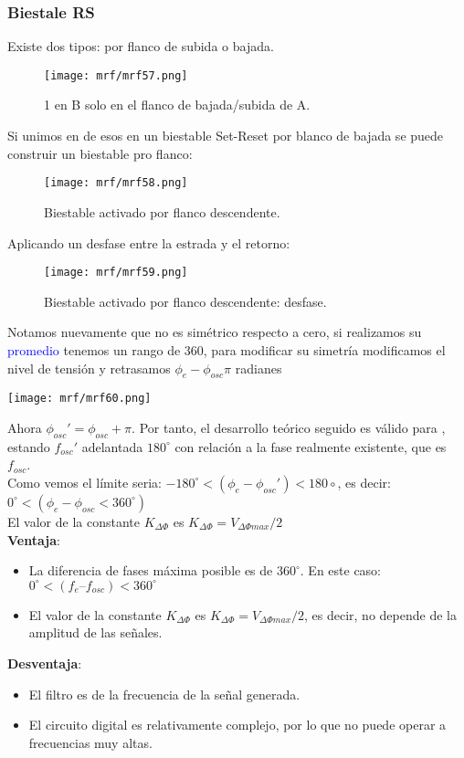 \documentclass[
	12pt, %
	fleqn, %
	a4paper, %
	oneside, %
]{LegrandOrangeBook}
\begin{document}
\subsubsection{Biestale RS}
Existe dos tipos: por flanco de subida o bajada. 
\begin{figure}[H]
\centering
\texttt{[image: mrf/mrf57.png]}
\caption{1 en B solo en el flanco de bajada/subida de A.}
\end{figure}
Si unimos en de esos en un biestable Set-Reset por blanco de bajada se puede construir un biestable pro flanco:
\begin{figure}[H]
\centering
\texttt{[image: mrf/mrf58.png]}
\caption{Biestable activado por flanco descendente.}
\end{figure}
Aplicando un desfase entre la estrada y el retorno:
\begin{figure}[H]
\centering
\texttt{[image: mrf/mrf59.png]}
\caption{Biestable activado por flanco descendente: desfase.}
\end{figure}
Notamos nuevamente que no es simétrico respecto a cero, si realizamos su \textcolor{blue}{promedio} tenemos un rango de 360, para modificar su simetría modificamos el nivel de tensión y retrasamos $\phi_e-\phi_{osc} \pi$ radianes
\begin{center}
\texttt{[image: mrf/mrf60.png]}
\end{center}
Ahora $\phi_{osc}'=\phi_{osc}+\pi$. Por tanto, el desarrollo teórico seguido es válido para , estando $f_{osc}'$ adelantada $180^\circ$ con relación a la fase realmente existente, que es $f_{osc}$.\\
Como vemos el límite seria: $-180^\circ<(\phi_e-\phi_{osc}')<180\circ$, es decir: $0^\circ<(\phi_e-\phi_{osc}<360^\circ)$\\
El valor de la constante $K_{\Delta\Phi}$ es $K_{\Delta\Phi}=V_{\Delta\Phi max}/2$\\
\textbf{Ventaja}:
\begin{itemize}
\item La diferencia de fases máxima posible es de $360^\circ$. En este caso:
$0^\circ < (f_e – f_{osc}) < 360^\circ$
\item El valor de la constante $K_{\Delta\Phi}$ es $K_{\Delta\Phi}=V_{\Delta\Phi max}/2$, es decir, no depende de la amplitud de las señales.
\end{itemize}
\textbf{Desventaja}:
\begin{itemize}
\item El filtro es de la frecuencia de la señal generada.
\item El circuito digital es relativamente complejo, por lo que no puede operar a frecuencias muy altas.
\end{itemize}
\end{document}
